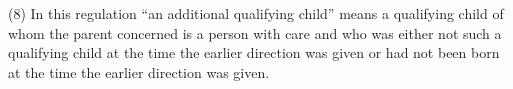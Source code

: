 \documentclass[a4paper]{article}
\begin{document}
%

(8) In this regulation “an additional qualifying child” means a qualifying child of whom the parent concerned is a person with care and who was either not such a qualifying child at the time the earlier direction was given or had not been born at the time the earlier direction was given.
\end{document}

